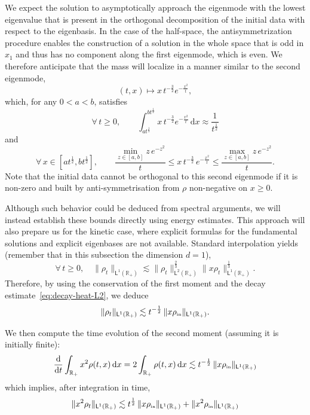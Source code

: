 \documentclass[11pt]{amsart}
\theoremstyle{definition}
\theoremstyle{remark}
\numberwithin{equation}{section}
\newcommand\R{{\mathbb R}}
\newcommand{\dd}{{\, \mathrm d}}
\newcommand{\dt}{\frac{{\rm d}}{{\rm d}t}}
\newcommand{\init}{\text{{\tiny {\rm in}}}}
\newcommand{\sfL}{\mathsf{L}}
\begin{document}
We expect the solution to asymptotically approach the eigenmode with the lowest eigenvalue that is present in the orthogonal decomposition of the initial data with respect to the eigenbasis. In the case of the half-space, the antisymmetrization procedure enables the construction of a solution in the whole space that is odd in $x_1$ and thus has no component along the first eigenmode, which is even. We therefore anticipate that the mass will localize in a manner similar to the second eigenmode,
\begin{equation*}
  (t, x) \mapsto x\, t^{-\frac{3}{2}} e^{-\frac{x^2}{t}},
\end{equation*}
which, for any $0 < a < b$, satisfies
\begin{equation*}
  \forall\, t \ge 0, \qquad \int_{at^{\frac{1}{2}}}^{bt^{\frac{1}{2}}} x\, t^{-\frac{3}{2}} e^{-\frac{x^2}{t}} \, \mathrm{d}x \approx \frac{1}{t^{\frac{1}{2}}}
\end{equation*}
and
\begin{equation*}
  \forall \, x \in \left[ a t^{\frac{1}{2}}, b t^{\frac{1}{2}} \right], \qquad \frac{\min_{z \in [a,b]} z \,e^{-z^2}}{t} \le x \, t^{-\frac32} \, e^{-\frac{x^2}{t}} \le \frac{\max_{z \in [a,b]} z \,e^{-z^2}}{t}.
\end{equation*}
Note that the initial data cannot be orthogonal to this second eigenmode if it is non-zero and built by anti-symmetrisation from $\rho$ non-negative on $x \ge 0$. 

Although such behavior could be deduced from spectral arguments, we will instead establish these bounds directly using energy estimates. This approach will also prepare us for the kinetic case, where explicit formulas for the fundamental solutions and explicit eigenbases are not available. Standard interpolation yields (remember that in this subsection the dimension $d=1$),
\begin{equation}
  \label{eq:interpol-L1L2L11}
  \forall \, t \ge 0, \quad \| \rho_t \|_{\sfL^{1}(\R_+)} \lesssim \| \rho_t \|_{\sfL^{2}(\R_+)} ^{\frac23} \| x \rho_t \|_{\sfL^{1}(\R_+)} ^{\frac13}.
\end{equation}
Therefore, by using the conservation of the first moment and the decay estimate~\eqref{eq:decay-heat-L2}, we deduce
\begin{equation}
  \label{eq:rateL1-heat}
  \| \rho_t \|_{\sfL^{1}(\R_+)} \lesssim t^{-\frac12} \, \| x \rho_\init \|_{\sfL^{1}(\R_+)}.
\end{equation}

We then compute the time evolution of the second moment (assuming it is initially finite):
\begin{equation*}
  \dt \int_{\R_+} x^2 \rho(t,x) \dd x = 2 \int_{\R_+} \rho(t,x) \dd x \lesssim t^{-\frac12}  \, \| x \rho_\init \|_{\sfL^{1}(\R_+)}
 \end{equation*}
 which implies, after integration in time,
 \begin{equation*}
  \| x^2 \rho_t \|_{\sfL^{1}(\R_+)} \lesssim t^{\frac12}  \, \| x \rho_\init \|_{\sfL^{1}(\R_+)} + \| x^2 \rho_{\init} \|_{\sfL^{1}(\R_+)}
\end{equation*}
\end{document}
